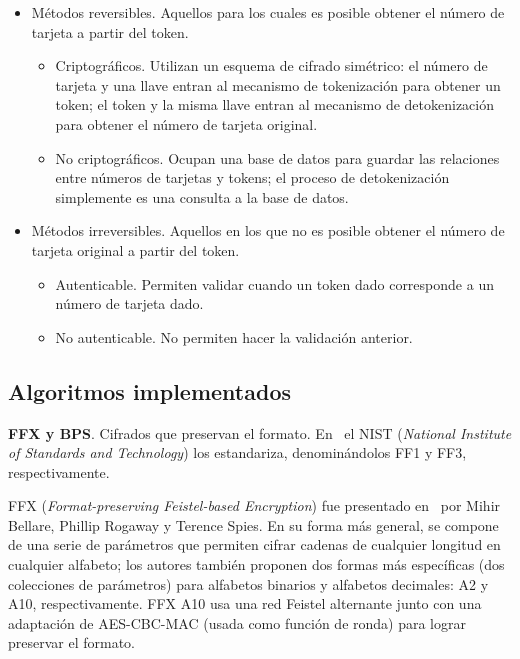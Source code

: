 \begin{itemize}
  \item Métodos reversibles. Aquellos para los cuales es posible obtener el
    número de tarjeta a partir del token.
    \begin{itemize}
      \item Criptográficos. Utilizan un esquema de cifrado simétrico: el número
        de tarjeta y una llave entran al mecanismo de tokenización para obtener
        un token; el token y la misma llave entran al mecanismo de
        detokenización para obtener el número de tarjeta original.
      \item No criptográficos. Ocupan una base de datos para guardar las
        relaciones entre números de tarjetas y tokens; el proceso de
        detokenización simplemente es una consulta a la base de datos.
    \end{itemize}
  \item Métodos irreversibles. Aquellos en los que no es posible obtener el
    número de tarjeta original a partir del token.
    \begin{itemize}
      \item Autenticable. Permiten validar cuando un token dado corresponde a
        un número de tarjeta dado.
      \item No autenticable. No permiten hacer la validación anterior.
    \end{itemize}
\end{itemize}

\subsection{Algoritmos implementados}
\label{sec:implementaciones}

\textbf{FFX y BPS}. Cifrados que preservan el formato. En~\cite{nist_fpe} el
NIST (\textit{National Institute of Standards and Technology}) los estandariza,
denominándolos FF1 y FF3, respectivamente.


FFX (\textit{Format-preserving Feistel-based Encryption}) fue presentado
en~\cite{ffx_1} por Mihir Bellare, Phillip Rogaway y Terence Spies. En su forma
más general, se compone de una serie de parámetros que permiten cifrar cadenas
de cualquier longitud en cualquier alfabeto; los autores también proponen dos
formas más específicas (dos colecciones de parámetros) para alfabetos binarios y
alfabetos decimales: A2 y A10, respectivamente. FFX A10 usa una red Feistel
alternante junto con una adaptación de AES-CBC-MAC (usada como función de ronda)
para lograr preservar el formato.

